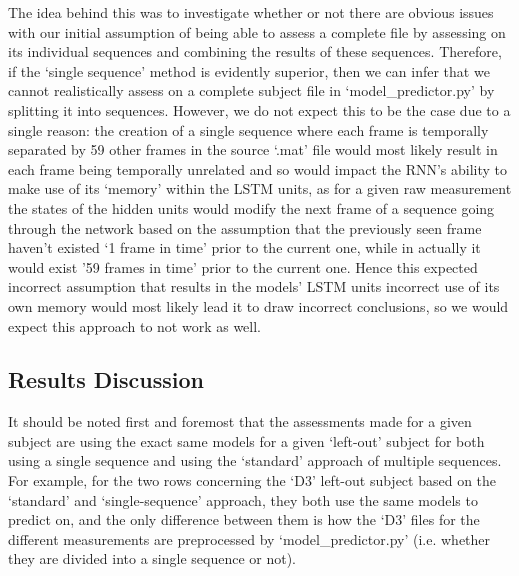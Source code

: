 \documentclass[12pt,twoside]{report}
\begin{document}
\quad The idea behind this was to investigate whether or not there are obvious issues with our initial assumption of being able to assess a complete file by assessing on its individual sequences and combining the results of these sequences. Therefore, if the ‘single sequence’ method is evidently superior, then we can infer that we cannot realistically assess on a complete subject file in ‘model\_predictor.py’ by splitting it into sequences. However, we do not expect this to be the case due to a single reason: the creation of a single sequence where each frame is temporally separated by 59 other frames in the source ‘.mat’ file would most likely result in each frame being temporally unrelated and so would impact the RNN’s ability to make use of its ‘memory’ within the LSTM units, as for a given raw measurement the states of the hidden units would modify the next frame of a sequence going through the network based on the assumption that the previously seen frame haven’t existed ‘1 frame in time’ prior to the current one, while in actually it would exist ’59 frames in time’ prior to the current one. Hence this expected incorrect assumption that results in the models’ LSTM units incorrect use of its own memory would most likely lead it to draw incorrect conclusions, so we would expect this approach to not work as well.


\subsection{Results Discussion}

\quad It should be noted first and foremost that the assessments made for a given subject are using the exact same models for a given ‘left-out’ subject for both using a single sequence and using the ‘standard’ approach of multiple sequences. For example, for the two rows concerning the ‘D3’ left-out subject based on the ‘standard’ and ‘single-sequence’ approach, they both use the same models to predict on, and the only difference between them is how the ‘D3’ files for the different measurements are preprocessed by ‘model\_predictor.py’ (i.e. whether they are divided into a single sequence or not).\\
\end{document}
